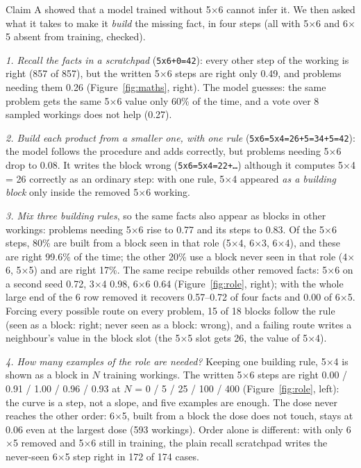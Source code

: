 \documentclass{article} %
\newcommand{\an}[1]{\texttt{#1}}
\begin{document}
Claim A showed that a model trained without 5$\times$6 cannot infer it. We then asked what it takes to make it
\emph{build} the missing fact, in four steps (all with 5$\times$6 and 6$\times$5 absent from training, checked).

\emph{1. Recall the facts in a scratchpad} (\an{5x6+0=42}): every other step of the working is right (857 of 857),
but the written 5$\times$6 steps are right only 0.49, and problems needing them 0.26 (Figure~\ref{fig:maths}, right).
The model guesses: the same problem gets the same 5$\times$6 value only 60\% of the time, and a vote over 8 sampled
workings does not help (0.27).

\emph{2. Build each product from a smaller one, with one rule} (\an{5x6=5x4=26+5=34+5=42}): the model follows the
procedure and adds correctly, but problems needing 5$\times$6 drop to 0.08. It writes the block wrong
(\an{5x6=5x4=22+\ldots}) although it computes 5$\times$4 = 26 correctly as an ordinary step: with one rule,
5$\times$4 appeared \emph{as a building block} only inside the removed 5$\times$6 working.

\emph{3. Mix three building rules}, so the same facts also appear as blocks in other workings: problems needing
5$\times$6 rise to 0.77 and its steps to 0.83. Of the 5$\times$6 steps, 80\% are built from a block seen in that role
(5$\times$4, 6$\times$3, 6$\times$4), and these are right 99.6\% of the time; the other 20\% use a block never seen
in that role (4$\times$6, 5$\times$5) and are right 17\%. The same recipe rebuilds other removed facts: 5$\times$6
on a second seed 0.72, 3$\times$4 0.98, 6$\times$6 0.64 (Figure~\ref{fig:role}, right); with the whole large end of
the 6 row removed it recovers 0.57--0.72 of four facts and 0.00 of 6$\times$5. Forcing every possible route on every
problem, 15 of 18 blocks follow the rule (seen as a block: right; never seen as a block: wrong), and a failing route
writes a neighbour's value in the block slot (the 5$\times$5 slot gets 26, the value of 5$\times$4).

\emph{4. How many examples of the role are needed?} Keeping one building rule, 5$\times$4 is shown as a block in
$N$ training workings. The written 5$\times$6 steps are right 0.00 / 0.91 / 1.00 / 0.96 / 0.93 at $N$ = 0 / 5 / 25
/ 100 / 400 (Figure~\ref{fig:role}, left): the curve is a step, not a slope, and five examples are enough. The dose
never reaches the other order: 6$\times$5, built from a block the dose does not touch, stays at 0.06 even at the
largest dose (593 workings). Order alone is different: with only 6$\times$5 removed and 5$\times$6 still in
training, the plain recall scratchpad writes the never-seen 6$\times$5 step right in 172 of 174 cases.
\end{document}
